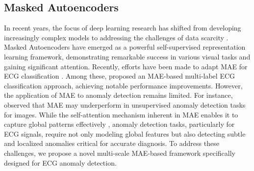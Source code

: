 \subsection{Masked Autoencoders}
In recent years, the focus of deep learning research has shifted from developing increasingly complex models to addressing the challenges of data scarcity \citep{zhang2023survey}. Masked Autoencoders \citep[MAE,][]{he2021masked} have emerged as a powerful self-supervised representation learning framework, demonstrating remarkable success in various visual tasks and gaining significant attention. Recently, efforts have been made to adapt MAE for ECG classification \citep{zhang2022maefe, yang2022masked, sawano2022masked, wang2023unsupervised, zhou2023masked}. Among these, \cite{zhou2023masked} proposed an MAE-based multi-label ECG classification approach, achieving notable performance improvements. However, the application of MAE to anomaly detection remains limited. For instance,  \cite{reiss2022anomaly} observed that MAE may underperform in unsupervised anomaly detection tasks for images. While the self-attention mechanism inherent in MAE enables it to capture global patterns effectively \citep{vaswani2017attention}, anomaly detection tasks, particularly for ECG signals, require not only modeling global features but also detecting subtle and localized anomalies critical for accurate diagnosis. To address these challenges, we propose a novel multi-scale MAE-based framework specifically designed for ECG anomaly detection.